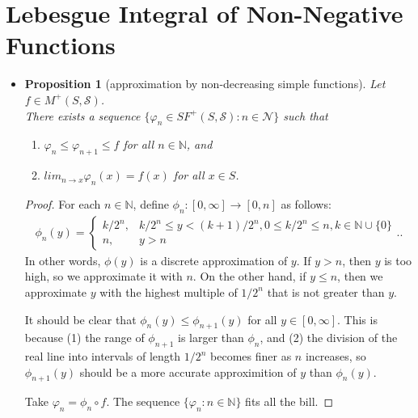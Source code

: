\documentclass[10pt]{article}
\newtheorem{proposition}[lemma]{Proposition}
\numberwithin{lemma}{section}
\newcommand{\mcal}[1]{\mathcal{#1}}
\newcommand{\Nat}{\mathbb{N}}
\begin{document}
\section{Lebesgue Integral of Non-Negative Functions}

\begin{itemize}
  \item \begin{proposition}[approximation by non-decreasing simple functions] \label{thm:approx-by-simple-functions}
    Let $f \in M^+(S, \mcal{S})$. \\
    There exists a sequence $\{ \varphi_n \in SF^+(S,\mcal{S}) : n \in \mcal{N} \}$ such that
    \begin{enumerate}
      \item $\varphi_n \leq \varphi_{n+1} \leq f$ for all $n \in \Nat$, and
      \item $lim_{n \rightarrow x} \varphi_n(x) = f(x)$ for all $x \in S$.
    \end{enumerate}
  \end{proposition}
  \begin{proof}
    For each $n \in \Nat$, define $\phi_n: [0,\infty] \rightarrow [0,n]$ as follows: 
    \begin{align*}
      \phi_n(y) = \begin{cases}
        k/2^{n}, & k/2^{n} \leq y < (k+1)/2^n, 0 \leq k/2^n \leq n, k \in \Nat \cup \{0\}\\
        n, & y > n
      \end{cases}..
    \end{align*}
    In other words, $\phi(y)$ is a discrete approximation of $y$. If $y > n$, then $y$ is too high, so we approximate it with $n$. On the other hand, if $y \leq n$, then 
    we approximate $y$ with the highest multiple of $1/2^n$ that is not greater than $y$. 
    
    It should be clear that $\phi_n(y) \leq \phi_{n+1}(y)$ for all $y \in [0,\infty]$. This is because (1) the range of $\phi_{n+1}$ is larger than $\phi_n$, and (2) the division of the real line into intervals of length $1/2^n$ becomes finer as $n$ increases, so $\phi_{n+1}(y)$ should be a more accurate approximition of $y$ than $\phi_n(y)$.

    Take $\varphi_n = \phi_n \circ f$. The sequence $\{ \varphi_n : n \in \Nat \}$ fits all the bill. 
  \end{proof}


\end{itemize}
\end{document}
